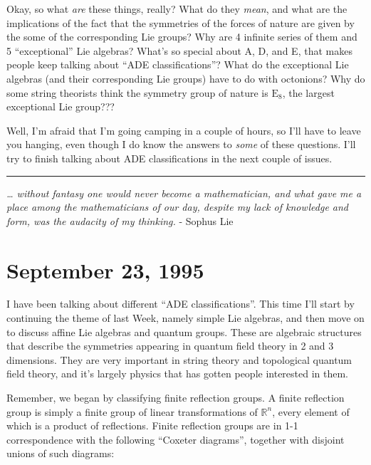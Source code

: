 \documentclass{article}
\begin{document}
Okay, so what \emph{are} these things, really? What do they \emph{mean},
and what are the implications of the fact that the symmetries of the
forces of nature are given by the some of the corresponding Lie groups?
Why are 4 infinite series of them and 5 ``exceptional'' Lie algebras?
What's so special about A, D, and E, that makes people keep talking
about ``ADE classifications''? What do the exceptional Lie algebras (and
their corresponding Lie groups) have to do with octonions? Why do some
string theorists think the symmetry group of nature is \(\mathrm{E}_8\),
the largest exceptional Lie group???

Well, I'm afraid that I'm going camping in a couple of hours, so I'll
have to leave you hanging, even though I do know the answers to
\emph{some} of these questions. I'll try to finish talking about ADE
classifications in the next couple of issues.

\begin{center}\rule{0.5\linewidth}{0.5pt}\end{center}

\emph{\ldots{} without fantasy one would never become a mathematician,
and what gave me a place among the mathematicians of our day, despite my
lack of knowledge and form, was the audacity of my thinking.} - Sophus
Lie



\hypertarget{week64}{%
\section{September 23, 1995}\label{week64}}

I have been talking about different ``ADE classifications''. This time
I'll start by continuing the theme of last Week, namely simple Lie
algebras, and then move on to discuss affine Lie algebras and quantum
groups. These are algebraic structures that describe the symmetries
appearing in quantum field theory in 2 and 3 dimensions. They are very
important in string theory and topological quantum field theory, and
it's largely physics that has gotten people interested in them.

Remember, we began by classifying finite reflection groups. A finite
reflection group is simply a finite group of linear transformations of
\(\mathbb{R}^n\), every element of which is a product of reflections.
Finite reflection groups are in 1-1 correspondence with the following
``Coxeter diagrams'', together with disjoint unions of such diagrams:
\end{document}
